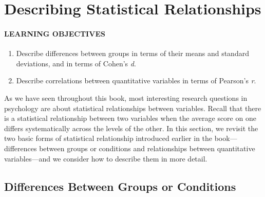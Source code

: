\documentclass[
]{krantz}
\providecommand{\tightlist}{%
  \setlength{\itemsep}{0pt}\setlength{\parskip}{0pt}}
\begin{document}
\section{Describing Statistical Relationships}\label{describing-statistical-relationships}

\paragraph*{LEARNING OBJECTIVES}\label{learning-objectives-34}

\begin{enumerate}
\def\labelenumi{\arabic{enumi}.}
\tightlist
\item
  Describe differences between groups in terms of their means and standard deviations, and in terms of Cohen's \emph{d}.
\item
  Describe correlations between quantitative variables in terms of Pearson's \emph{r}.
\end{enumerate}

As we have seen throughout this book, most interesting research questions in psychology are about statistical relationships between variables. Recall that there is a statistical relationship between two variables when the average score on one differs systematically across the levels of the other. In this section, we revisit the two basic forms of statistical relationship introduced earlier in the book---differences between groups or conditions and relationships between quantitative variables---and we consider how to describe them in more detail.

\subsection*{Differences Between Groups or Conditions}\label{differences-between-groups-or-conditions}
\end{document}

